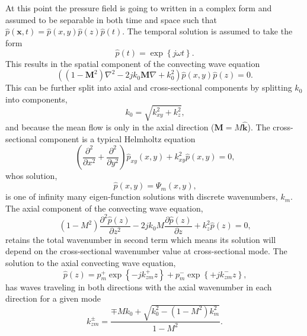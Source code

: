 At this point the pressure field is going to written in a complex form and assumed to be separable in both time and space such that $\hat{p}(\mathbf{x},t) = \hat{p}(x,y)\hat{p}(z)\hat{p}(t)$.
The temporal solution is assumed to take the form
\begin{equation}
  \hat{p}(t) = \exp\left\{j\omega t\right\} \textrm{.}
  \label{eqn:02_pressure_solution_time}
\end{equation}
This results in the spatial component of the convecting wave equation
\begin{equation}
  \left((1-\mathbf{M}^2)\nabla^2-2jk_0\mathbf{M}\nabla+k_0^2\right)\hat{p}(x,y)\hat{p}(z) = 0 \textrm{.}
  \label{eqn:02_wave_conv_space}
\end{equation}
This can be further split into axial and cross-sectional components by splitting $k_0$ into components,
\begin{equation}
  k_0 = \sqrt{k_{xy}^2+k_z^2} \textrm{,}
  \label{eqn:02_k0}
\end{equation}
and because the mean flow is only in the axial direction ($\mathbf{M} = M\mathbf{\hat{k}}$).
The cross-sectional component is a typical Helmholtz equation
\begin{equation}
  \left(\frac{\partial^2}{\partial x^2}+\frac{\partial^2}{\partial y^2}\right)\hat{p}_{xy}(x,y)+k_{xy}^2\hat{p}(x,y) = 0 \textrm{,}
  \label{eqn:02_wave_xy}
\end{equation}
whos solution,
\begin{equation}
  \hat{p}(x,y) = \Psi_m(x,y) \textrm{,}
  \label{eqn:02_pressure_solution_xy}
\end{equation}
is one of infinity many eigen-function solutions with discrete wavenumbers, $k_m$.
The axial component of the convecting wave equation,
\begin{equation}
  (1-M^2)\frac{\partial^2\hat{p}(z)}{\partial z^2} - 2jk_0M\frac{\partial\hat{p}(z)}{\partial z} + k_z^2\hat{p}(z) = 0 \textrm{,}
  \label{eqn:02_wave_z}
\end{equation}
retains the total wavenumber in second term which means its solution will depend on the cross-sectional wavenumber value at cross-sectional mode.
The solution to the axial convecting wave equation,
\begin{equation}
  \hat{p}(z) = p^+_m\exp{\left\{-jk^+_{zm}z\right\}}+p^-_m\exp{\left\{+jk^-_{zm}z\right\}} \textrm{,}
  \label{eqn:02_pressure_solution_z}
\end{equation}
has waves traveling in both directions with the axial wavenumber in each direction for a given mode
\begin{equation}
  k^\pm_{zm} = \frac{\mp Mk_0+\sqrt{k_0^2-(1-M^2)k_m^2}}{1-M^2} \textrm{.}
  \label{eqn:02_kzm}
\end{equation}

